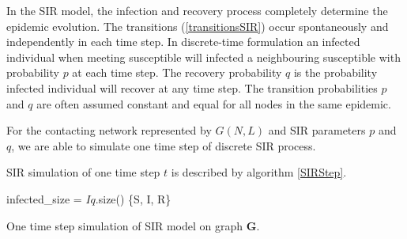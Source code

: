 \documentclass[times, utf8, diplomski]{fer}
\begin{document}
In the SIR model, the infection and recovery process completely determine the epidemic evolution. The transitions (\ref{transitionsSIR}) occur spontaneously and independently in each time step. In discrete-time formulation an infected individual when meeting susceptible will infected a neighbouring susceptible with probability $p$ at each time step. The recovery probability $q$ is the probability infected individual will recover at any time step. The transition probabilities $p$ and $q$ are often assumed constant and equal for all nodes in the same epidemic. 

For the contacting network represented by $G(N, L)$ and SIR parameters $p$ and $q$, we are able to simulate one time step of discrete SIR process.  

SIR simulation of one time step $t$ is described by algorithm \ref{SIRStep}. %
\vspace{10mm}

\begin{algorithm}[H]
 infected\_size = $Iq$.size()\;
  \Return \{S, I, R\}
 \label{SIRStep}
 \caption{One time step simulation of SIR model on graph $\mathbf{G}$.}
\end{algorithm}
\end{document}
